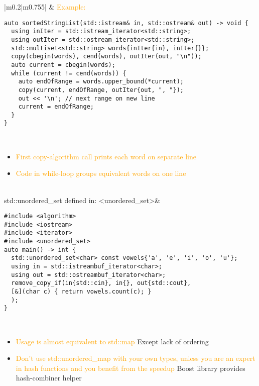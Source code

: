 \documentclass[main.tex,fontsize=8pt,paper=a4,paper=portrait,DIV=calc,]{scrartcl}
\begin{document}
\begin{table}[ht!]
\begin{tabular}{|m{0.2\linewidth}|m{0.755\linewidth}|}
\hline
&
\textcolor{orange}{Example:}\newline
\begin{lstlisting}
auto sortedStringList(std::istream& in, std::ostream& out) -> void {
  using inIter = std::istream_iterator<std::string>;
  using outIter = std::ostream_iterator<std::string>;
  std::multiset<std::string> words{inIter{in}, inIter{}};
  copy(cbegin(words), cend(words), outIter(out, "\n"));
  auto current = cbegin(words);
  while (current != cend(words)) {
    auto endOfRange = words.upper_bound(*current);
    copy(current, endOfRange, outIter{out, ", "});
    out << '\n'; // next range on new line
    current = endOfRange;
  }
}
\end{lstlisting} 
\, \newline
\begin{itemize}
\item \textcolor{orange}{First copy-algorithm call prints each word on separate line}
\item \textcolor{orange}{Code in while-loop groups equivalent words on one line}
\vspace{-2mm}
\end{itemize} \\
\hline
std::unordered\_set \newline 
defined in: <unordered\_set>& 
\begin{lstlisting}
#include <algorithm>
#include <iostream>
#include <iterator>
#include <unordered_set>
auto main() -> int {
  std::unordered_set<char> const vowels{'a', 'e', 'i', 'o', 'u'};
  using in = std::istreambuf_iterator<char>;
  using out = std::ostreambuf_iterator<char>;
  remove_copy_if(in{std::cin}, in{}, out{std::cout},
  [&](char c) { return vowels.count(c); }
  );
}
\end{lstlisting}
\, \newline
\begin{itemize}
\item \textcolor{orange}{Usage is almost equivalent to std::map}\newline
  Except lack of ordering
\item \textcolor{orange}{Don't use std::unordered\_map with your own types, unless you are an expert in hash functions and you benefit from the speedup}\newline
  Boost library provides hash-combiner helper
\vspace{-2mm}

\end{itemize}
\end{tabular}
\end{table}
\end{document}
